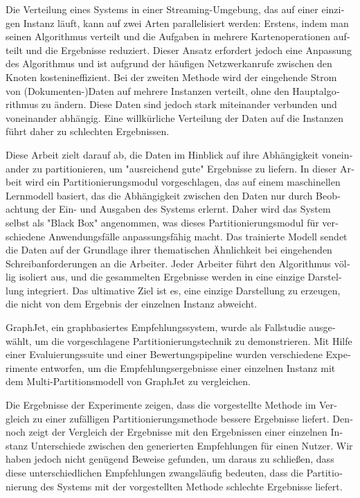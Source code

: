 \null\vfil
\begin{otherlanguage}{ngerman}
\begin{center}\textsf{\textbf{\abstractname}}\end{center}

\noindent 
Die Verteilung eines Systems in einer Streaming-Umgebung, das auf einer einzigen Instanz läuft, kann auf zwei Arten parallelisiert werden: Erstens, indem man seinen Algorithmus verteilt und die Aufgaben in mehrere Kartenoperationen aufteilt und die Ergebnisse reduziert. Dieser Ansatz erfordert jedoch eine Anpassung des Algorithmus und ist aufgrund der häufigen Netzwerkanrufe zwischen den Knoten kostenineffizient. Bei der zweiten Methode wird der eingehende Strom von (Dokumenten-)Daten auf mehrere Instanzen verteilt, ohne den Hauptalgorithmus zu ändern. Diese Daten sind jedoch stark miteinander verbunden und voneinander abhängig. Eine willkürliche Verteilung der Daten auf die Instanzen führt daher zu schlechten Ergebnissen.

Diese Arbeit zielt darauf ab, die Daten im Hinblick auf ihre Abhängigkeit voneinander zu partitionieren, um "ausreichend gute" Ergebnisse zu liefern. In dieser Arbeit wird ein Partitionierungsmodul vorgeschlagen, das auf einem maschinellen Lernmodell basiert, das die Abhängigkeit zwischen den Daten nur durch Beobachtung der Ein- und Ausgaben des Systems erlernt. Daher wird das System selbst als "Black Box" angenommen, was dieses Partitionierungsmodul für verschiedene Anwendungsfälle anpassungsfähig macht. Das trainierte Modell sendet die Daten auf der Grundlage ihrer thematischen Ähnlichkeit bei eingehenden Schreibanforderungen an die Arbeiter. Jeder Arbeiter führt den Algorithmus völlig isoliert aus, und die gesammelten Ergebnisse werden in eine einzige Darstellung integriert. Das ultimative Ziel ist es, eine einzige Darstellung zu erzeugen, die nicht von dem Ergebnis der einzelnen Instanz abweicht.

GraphJet, ein graphbasiertes Empfehlungssystem, wurde als Fallstudie ausgewählt, um die vorgeschlagene Partitionierungstechnik zu demonstrieren. Mit Hilfe einer Evaluierungssuite und einer Bewertungspipeline wurden verschiedene Experimente entworfen, um die Empfehlungsergebnisse einer einzelnen Instanz mit dem Multi-Partitionsmodell von GraphJet zu vergleichen.


Die Ergebnisse der Experimente zeigen, dass die vorgestellte Methode im Vergleich zu einer zufälligen Partitionierungsmethode bessere Ergebnisse liefert. Dennoch zeigt der Vergleich der Ergebnisse mit den Ergebnissen einer einzelnen Instanz Unterschiede zwischen den generierten Empfehlungen für einen Nutzer. Wir haben jedoch nicht genügend Beweise gefunden, um daraus zu schließen, dass diese unterschiedlichen Empfehlungen zwangsläufig bedeuten, dass die Partitionierung des Systems mit der vorgestellten Methode schlechte Ergebnisse liefert.


\end{otherlanguage}
\vfil\null



